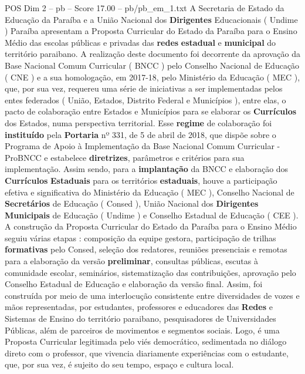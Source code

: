\begin{textsample}{POS Dim 2 – pb – Score 17.00 – pb/pb\_em\_1.txt}  \label{ex:f2_pos_279}
A Secretaria de Estado da Educação da Paraíba e a União Nacional dos \textbf{Dirigentes} Educacionais ( Undime ) Paraíba apresentam a Proposta Curricular do Estado da Paraíba para o Ensino Médio das escolas públicas e privadas das \textbf{redes} \textbf{estadual} e \textbf{municipal} do território paraibano.
A realização deste documento foi decorrente da aprovação da Base Nacional Comum Curricular ( BNCC ) pelo Conselho Nacional de Educação ( CNE ) e a sua homologação, em 2017-18, pelo Ministério da Educação ( MEC ), que, por sua vez, requereu uma série de iniciativas a ser implementadas pelos entes federados ( União, Estados, Distrito Federal e Municípios ), entre elas, o pacto de colaboração entre Estados e Municípios para se elaborar os \textbf{Currículos} dos Estados, numa perspectiva territorial.
Esse \textbf{regime} de colaboração foi \textbf{instituído} pela \textbf{Portaria} nº 331, de 5 de abril de 2018, que dispõe sobre o Programa de Apoio à Implementação da Base Nacional Comum Curricular - ProBNCC e estabelece \textbf{diretrizes}, parâmetros e critérios para sua implementação.
Assim sendo, para a \textbf{implantação} da BNCC e elaboração dos \textbf{Currículos} \textbf{Estaduais} para os territórios \textbf{estaduais}, houve a participação efetiva e significativa do Ministério da Educação ( MEC ), Conselho Nacional de \textbf{Secretários} de Educação ( Consed ), União Nacional dos \textbf{Dirigentes} \textbf{Municipais} de Educação ( Undime ) e Conselho Estadual de Educação ( CEE ).
A construção da Proposta Curricular do Estado da Paraíba para o Ensino Médio seguiu várias etapas : composição da equipe gestora, participação de trilhas \textbf{formativas} pelo Consed, seleção dos redatores, reuniões presenciais e remotas para a elaboração da versão \textbf{preliminar}, consultas públicas, escutas à comunidade escolar, seminários, sistematização das contribuições, aprovação pelo Conselho Estadual de Educação e elaboração da versão final.
Assim, foi construída por meio de uma interlocução consistente entre diversidades de vozes e mãos representadas, por estudantes, professores e educadores das \textbf{Redes} e Sistemas de Ensino do território paraibano, pesquisadores de Universidades Públicas, além de parceiros de movimentos e segmentos sociais.
Logo, é uma Proposta Curricular legitimada pelo viés democrático, sedimentada no diálogo direto com o professor, que vivencia diariamente experiências com o estudante, que, por sua vez, é sujeito do seu tempo, espaço e cultura local.

\end{textsample}

